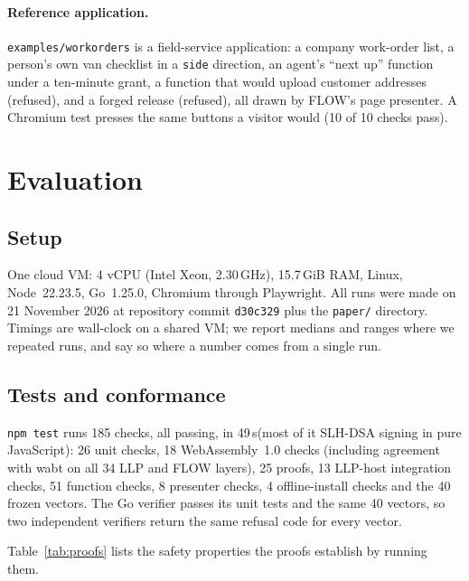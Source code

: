 \documentclass[10pt,twocolumn]{article}
\newcommand{\code}[1]{\texttt{#1}}
\newcommand{\s}{\,s\xspace}
\begin{document}
\paragraph{Reference application.} \code{examples/workorders} is a field-service application: a
company work-order list, a person's own van checklist in a \code{side} direction, an agent's
``next up'' function under a ten-minute grant, a function that would upload customer addresses
(refused), and a forged release (refused), all drawn by FLOW's page presenter. A Chromium test
presses the same buttons a visitor would (10 of 10 checks pass).

\section{Evaluation}
\label{sec:eval}

\subsection{Setup}
\label{sec:setup}

One cloud VM: 4 vCPU (Intel Xeon, 2.30\,GHz), 15.7\,GiB RAM, Linux, Node~22.23.5, Go~1.25.0,
Chromium through Playwright. All runs were made on 21 November 2026 at repository commit
\code{d30c329} plus the \code{paper/} directory. Timings are wall-clock on a shared VM; we report
medians and ranges where we repeated runs, and say so where a number comes from a single run.

\subsection{Tests and conformance}

\code{npm test} runs 185 checks, all passing, in 49\s (most of it SLH-DSA signing in pure
JavaScript): 26 unit checks, 18 WebAssembly~1.0 checks (including agreement with wabt on all 34 LLP
and FLOW layers), 25 proofs, 13 LLP-host integration checks, 51 function checks, 8 presenter checks,
4 offline-install checks and the 40 frozen vectors. The Go verifier passes its unit tests and the
same 40 vectors, so two independent verifiers return the same refusal code for every vector.

Table~\ref{tab:proofs} lists the safety properties the proofs establish by running them.
\end{document}

